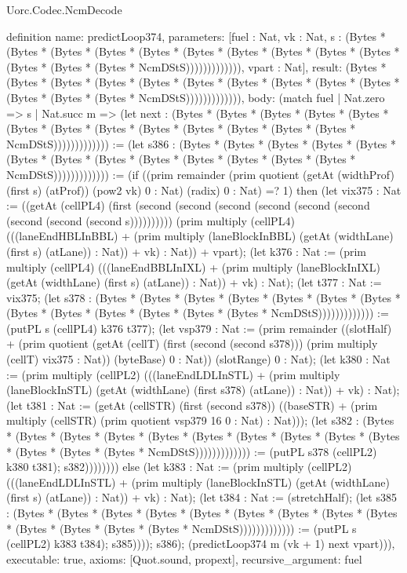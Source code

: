\begin{lexlean}{Uorc.Codec.NcmDecode}
\begin{semanticmodule}
definition{
  name: predictLoop374,
  parameters: [fuel : Nat, vk : Nat, s : (Bytes * (Bytes * (Bytes * (Bytes * (Bytes * (Bytes * (Bytes * (Bytes * (Bytes * (Bytes * (Bytes * (Bytes * (Bytes * NcmDStS))))))))))))), vpart : Nat],
  result: (Bytes * (Bytes * (Bytes * (Bytes * (Bytes * (Bytes * (Bytes * (Bytes * (Bytes * (Bytes * (Bytes * (Bytes * (Bytes * NcmDStS))))))))))))),
  body: (match fuel
    | Nat.zero => s
    | Nat.succ m => (let next : (Bytes * (Bytes * (Bytes * (Bytes * (Bytes * (Bytes * (Bytes * (Bytes * (Bytes * (Bytes * (Bytes * (Bytes * (Bytes * NcmDStS))))))))))))) := (let s386 : (Bytes * (Bytes * (Bytes * (Bytes * (Bytes * (Bytes * (Bytes * (Bytes * (Bytes * (Bytes * (Bytes * (Bytes * (Bytes * NcmDStS))))))))))))) := (if ((prim remainder (prim quotient (getAt (widthProf) (first s) (atProf)) (pow2 vk) 0 : Nat) (radix) 0 : Nat) =? 1) then (let vix375 : Nat := ((getAt (cellPL4) (first (second (second (second (second (second (second (second (second (second s)))))))))) (prim multiply (cellPL4) (((laneEndHBLInBBL) + (prim multiply (laneBlockInBBL) (getAt (widthLane) (first s) (atLane)) : Nat)) + vk) : Nat)) + vpart); (let k376 : Nat := (prim multiply (cellPL4) (((laneEndBBLInIXL) + (prim multiply (laneBlockInIXL) (getAt (widthLane) (first s) (atLane)) : Nat)) + vk) : Nat); (let t377 : Nat := vix375; (let s378 : (Bytes * (Bytes * (Bytes * (Bytes * (Bytes * (Bytes * (Bytes * (Bytes * (Bytes * (Bytes * (Bytes * (Bytes * (Bytes * NcmDStS))))))))))))) := (putPL s (cellPL4) k376 t377); (let vsp379 : Nat := (prim remainder ((slotHalf) + (prim quotient (getAt (cellT) (first (second (second s378))) (prim multiply (cellT) vix375 : Nat)) (byteBase) 0 : Nat)) (slotRange) 0 : Nat); (let k380 : Nat := (prim multiply (cellPL2) (((laneEndLDLInSTL) + (prim multiply (laneBlockInSTL) (getAt (widthLane) (first s378) (atLane)) : Nat)) + vk) : Nat); (let t381 : Nat := (getAt (cellSTR) (first (second s378)) ((baseSTR) + (prim multiply (cellSTR) (prim quotient vsp379 16 0 : Nat) : Nat))); (let s382 : (Bytes * (Bytes * (Bytes * (Bytes * (Bytes * (Bytes * (Bytes * (Bytes * (Bytes * (Bytes * (Bytes * (Bytes * (Bytes * NcmDStS))))))))))))) := (putPL s378 (cellPL2) k380 t381); s382)))))))) else (let k383 : Nat := (prim multiply (cellPL2) (((laneEndLDLInSTL) + (prim multiply (laneBlockInSTL) (getAt (widthLane) (first s) (atLane)) : Nat)) + vk) : Nat); (let t384 : Nat := (stretchHalf); (let s385 : (Bytes * (Bytes * (Bytes * (Bytes * (Bytes * (Bytes * (Bytes * (Bytes * (Bytes * (Bytes * (Bytes * (Bytes * (Bytes * NcmDStS))))))))))))) := (putPL s (cellPL2) k383 t384); s385)))); s386); (predictLoop374 m (vk + 1) next vpart))),
  executable: true,
  axioms: [Quot.sound, propext],
  recursive_argument: fuel
}


\end{semanticmodule}
\end{lexlean}
